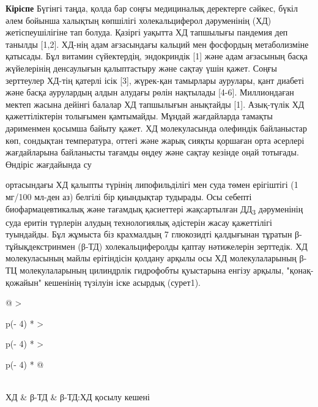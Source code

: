 {\bfseries Кіріспе} Бүгінгі таңда, қолда бар соңғы медициналық деректерге
сәйкес, бүкіл әлем бойынша халықтың көпшілігі холекальциферол
дәруменінің (ХД) жетіспеушілігіне тап болуда. Қазіргі уақытта ХД
тапшылығы пандемия деп танылды {[}1,2{]}. ХД-нің адам ағзасындағы
кальций мен фосфордың метаболизміне қатысады. Бұл витамин сүйектердің,
эндокриндік {[}1{]} және адам ағзасының басқа жүйелерінің денсаулығын
қалыптастыру және сақтау үшін қажет. Соңғы зерттеулер ХД-тің қатерлі
ісік {[}3{]}, жүрек-қан тамырлары аурулары, қант диабеті және басқа
аурулардың алдын алудағы рөлін нақтылады {[}4-6{]}. Миллиондаған мектеп
жасына дейінгі балалар ХД тапшылығын анықтайды {[}1{]}. Азық-түлік ХД
қажеттіліктерін толығымен қамтымайды. Мұндай жағдайларда тамақты
дәрименмен қосымша байыту қажет. ХД молекуласында олефиндік байланыстар
көп, сондықтан температура, оттегі және жарық сияқты қоршаған орта
әсерлері жағдайларына байланысты тағамды өңдеу және сақтау кезінде оңай
тотығады. Өндіріс жағдайында су

ортасындағы ХД қалыпты түрінің липофильділігі мен суда төмен ерігіштігі
(1 мг/100 мл-ден аз) белгілі бір қиындықтар тудырады. Осы себепті
биофармацевтикалық және тағамдық қасиеттері жақсартылған
ДД\textsubscript{3} дәруменінің суда еритін түрлерін алудың
технологиялық әдістерін жасау қажеттілігі туындайды. Бұл жұмыста біз
крахмалдың 7 глюкозидті қалдығынан тұратын β-тұйықдекстринмен (β-ТД)
холекальциферолды қаптау нәтижелерін зерттедік. ХД молекуласының майлы
ерітіндісін қолдану арқылы осы ХД молекулаларының β-ТЦ молекулаларының
цилиндрлік гидрофобты қуыстарына енгізу арқылы, "қонақ-қожайын"
кешенінің түзілуін іске асырдық (сурет1).

\begin{longtable}[]{@{}
  >{\raggedright\arraybackslash}p{(\columnwidth - 4\tabcolsep) * }
  >{\raggedright\arraybackslash}p{(\columnwidth - 4\tabcolsep) * }
  >{\raggedright\arraybackslash}p{(\columnwidth - 4\tabcolsep) * }@{}}
\toprule\noalign{}
 \\
\midrule\noalign{}
\endhead
\bottomrule\noalign{}
\endlastfoot
ХД & β-ТД & β-ТД:ХД қосылу кешені \\
\end{longtable}

